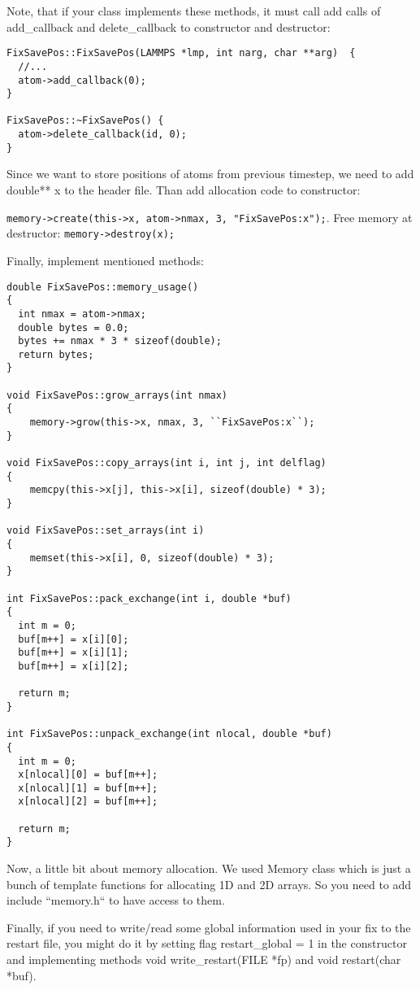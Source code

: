 \documentclass{article}
\begin{document}
Note, that if your class implements these methods, it must call add calls of
add\_callback and delete\_callback to constructor and destructor:

\begin{center}
\begin{verbatim}
FixSavePos::FixSavePos(LAMMPS *lmp, int narg, char **arg)  {
  //...
  atom->add_callback(0);
}

FixSavePos::~FixSavePos() {
  atom->delete_callback(id, 0);
}
\end{verbatim}
\end{center}

Since we want to store positions of atoms from previous timestep, we
need to add double** x to the header file. Than add allocation code to
constructor:

\verb|memory->create(this->x, atom->nmax, 3, "FixSavePos:x");|. Free memory
at destructor: \verb|memory->destroy(x);|

Finally, implement mentioned methods:

\begin{center}
\begin{verbatim}
double FixSavePos::memory_usage()
{
  int nmax = atom->nmax;
  double bytes = 0.0;
  bytes += nmax * 3 * sizeof(double);
  return bytes;
}

void FixSavePos::grow_arrays(int nmax)
{
    memory->grow(this->x, nmax, 3, ``FixSavePos:x``);
}

void FixSavePos::copy_arrays(int i, int j, int delflag)
{
    memcpy(this->x[j], this->x[i], sizeof(double) * 3);
}

void FixSavePos::set_arrays(int i)
{
    memset(this->x[i], 0, sizeof(double) * 3);
}

int FixSavePos::pack_exchange(int i, double *buf)
{
  int m = 0;
  buf[m++] = x[i][0];
  buf[m++] = x[i][1];
  buf[m++] = x[i][2];

  return m;
}

int FixSavePos::unpack_exchange(int nlocal, double *buf)
{
  int m = 0;
  x[nlocal][0] = buf[m++];
  x[nlocal][1] = buf[m++];
  x[nlocal][2] = buf[m++];

  return m;
}
\end{verbatim}
\end{center}

Now, a little bit about memory allocation. We used Memory class which
is just a bunch of template functions for allocating 1D and 2D
arrays. So you need to add include ``memory.h`` to have access to them.

Finally, if you need to write/read some global information used in
your fix to the restart file, you might do it by setting flag
restart\_global = 1 in the constructor and implementing methods void
write\_restart(FILE *fp) and void restart(char *buf).
\end{document}
